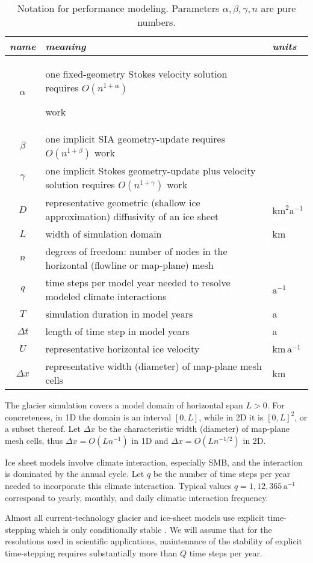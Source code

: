 \documentclass[twocolumn,letterpaper]{igs}
\begin{document}
\begin{table*}[ht]
\begin{tabular}{cll}
\emph{name} & \emph{meaning} & \emph{units} \\ \hline
$\alpha$    & one fixed-geometry Stokes velocity solution requires $O(n^{1+\alpha})${\large \strut} work\\
$\beta$     & one implicit SIA geometry-update requires $O(n^{1+\beta})$ work \\
$\gamma$    & one implicit Stokes geometry-update plus velocity solution requires $O(n^{1+\gamma})$ work \\
$D$         & representative geometric (shallow ice approximation) diffusivity of an ice sheet & $\text{km}^2 \text{a}^{-1}$ \\
$L$         & width of simulation domain & km \\
$n$         & degrees of freedom: number of nodes in the horizontal (flowline or map-plane) mesh \\
$q$         & time steps per model year needed to resolve modeled climate interactions & $\text{a}^{-1}$ \\
$T$         & simulation duration in model years & a \\
$\Delta t$  & length of time step in model years & a \\
$U$         & representative horizontal ice velocity & $\text{km}\,\text{a}^{-1}$ \\
$\Delta x$  & representative width (diameter) of map-plane mesh cells & km
\end{tabular}
\caption{Notation for performance modeling.  Parameters $\alpha,\beta,\gamma,n$ are pure numbers.}
\label{tab:notation}
\end{table*}

The glacier simulation covers a model domain of horizontal span $L>0$.  For concreteness, in 1D the domain is an interval $[0,L]$, while in 2D it is $[0,L]^2$, or a subset thereof.  Let $\Delta x$ be the characteristic width (diameter) of map-plane mesh cells, thus $\Delta x = O(L n^{-1})$ in 1D and $\Delta x = O(L n^{-1/2})$ in 2D.

Ice sheet models involve climate interaction, especially SMB, and the interaction is dominated by the annual cycle.  Let $q$ be the number of time steps per year needed to incorporate this climate interaction.  Typical values $q=1,12,365 \,\text{a}^{-1}$ correspond to yearly, monthly, and daily climatic interaction frequency.

Almost all current-technology glacier and ice-sheet models use explicit time-stepping which is only conditionally stable \citep{LeVeque2007}.  We will assume that for the resolutions used in scientific applications, maintenance of the stability of explicit time-stepping requires substantially more than $Q$ time steps per year.
\end{document}
